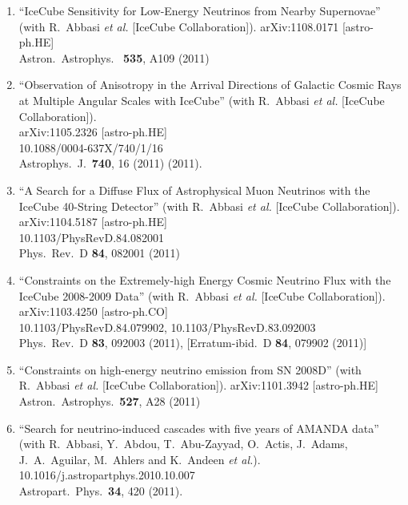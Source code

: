 \begin{enumerate}
\item ``IceCube Sensitivity for Low-Energy Neutrinos from
        Nearby   Supernovae'' (with R.~Abbasi {\it et al.}
        [IceCube Collaboration]). arXiv:1108.0171
        [astro-ph.HE] \\{}Astron.\ Astrophys.\ {\bf
        535}, A109 (2011) %

\item ``Observation of Anisotropy in the Arrival Directions
        of Galactic   Cosmic Rays at Multiple Angular Scales
        with IceCube'' (with R.~Abbasi   {\it et al.}
        [IceCube Collaboration]).  \\{}arXiv:1105.2326
        [astro-ph.HE] \\{}10.1088/0004-637X/740/1/16
        \\{}Astrophys.\ J.\ {\bf 740}, 16 (2011) %
        (2011).

\item ``A Search for a Diffuse Flux of Astrophysical Muon
        Neutrinos with the   IceCube 40-String Detector''
        (with R.~Abbasi {\it et al.}  [IceCube
        Collaboration]).  \\{}arXiv:1104.5187 [astro-ph.HE]
        \\{}10.1103/PhysRevD.84.082001 \\{}Phys.\ Rev.\ D
        {\bf 84}, 082001   (2011) %

\item ``Constraints on the Extremely-high Energy Cosmic
        Neutrino Flux with   the IceCube 2008-2009 Data''
        (with R.~Abbasi {\it et al.}  [IceCube
        Collaboration]).  \\{}arXiv:1103.4250 [astro-ph.CO]
        \\{}10.1103/PhysRevD.84.079902,
        10.1103/PhysRevD.83.092003   \\{}Phys.\ Rev.\ D {\bf
        83}, 092003 (2011), [Erratum-ibid.\ D {\bf
        84}, 079902 (2011)] %

\item ``Constraints on high-energy neutrino emission from SN
        2008D'' (with R.~Abbasi {\it et al.}  [IceCube
        Collaboration]). arXiv:1101.3942 [astro-ph.HE]
        \\{}Astron.\ Astrophys.\ {\bf     527}, A28 (2011)

\item ``Search for neutrino-induced cascades with five years
        of AMANDA   data'' (with R.~Abbasi, Y.~Abdou,
        T.~Abu-Zayyad, O.~Actis, J.~Adams,   J.~A.~Aguilar,
        M.~Ahlers and K.~Andeen {\it et al.}).
        10.1016/j.astropartphys.2010.10.007 \\{}Astropart.\
        Phys.\ {\bf     34}, 420 (2011).


\end{enumerate}
